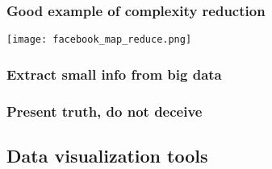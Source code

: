 \documentclass[xcolor=dvipsnames, 9pt]{beamer}
\begin{document}
\begin{frame}[fragile]
    \frametitle{Good example of complexity reduction}
    \begin{center}
        \texttt{[image: facebook\_map\_reduce.png]}
    \end{center}
\end{frame}


\begin{frame}[fragile]
    \frametitle{Extract \textbf{small} info from big data}
    \begin{center}
    \end{center}
\end{frame}

\begin{frame}[fragile]
    \frametitle{Present \textbf{truth}, do not deceive}
    \begin{center}
    \end{center}
\end{frame}


\subsection{Data visualization tools} %
\label{sub:data_visualization_tools}
\end{document}
